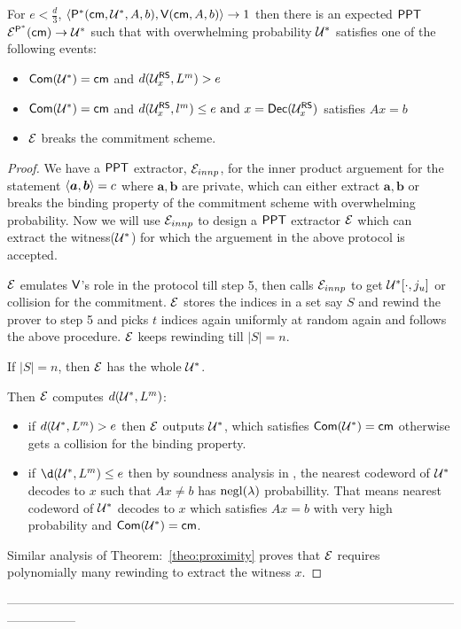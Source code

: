 \begin{theorem}
	For $e < \frac{d}{3} $, $\langle \mathsf{P}^*(\mathsf{cm}, \mathcal{U}^*, A, b),\mathsf{V}(\mathsf{cm}, A, b)\rangle \rightarrow 1 $ then there is an expected $\mathsf{PPT}$ $\mathcal{E}^{\mathsf{P}^*}(\mathsf{cm}) \rightarrow \mathcal{U}^*$ such that with overwhelming probability $\mathcal{U}^*$ satisfies one of the following events:
	\begin{itemize}
		\item $\mathsf{Com}(\mathcal{U}^*)=\mathsf{cm}$ and $d(\mathcal{U}^{\mathsf{RS}}_x,L^m) > e $
		\item $\mathsf{Com}(\mathcal{U}^*)=\mathsf{cm}$ and $d(\mathcal{U}^{\mathsf{RS}}_x, l^m)\leq e \text{ and } x = \mathsf{Dec}(\mathcal{U}^{\mathsf{RS}}_x)$ satisfies $ Ax = b$
		\item $\mathcal{E}$ breaks the commitment scheme.
	\end{itemize}
\end{theorem}

\begin{proof}
	We have a $\mathsf{PPT}$ extractor, $\mathcal{E}_{innp}$, for the inner product arguement for the statement $\langle \bm{a},\bm{b}\rangle=c$ where $\bm{a},\bm{b}$ are private, which can either extract $\bm{a}, \bm{b}$ or breaks the binding property of the commitment scheme with overwhelming probability. Now we will use $\mathcal{E}_{innp}$ to design a $\mathsf{PPT}$ extractor $\mathcal{E}$ which can extract the witness($\mathcal{U}^*$) for which the arguement in the above protocol is accepted.
	
	$\mathcal{E}$ emulates $\mathsf{V}$'s role in the protocol till step 5, then calls $\mathcal{E}_{innp}$ to get $\mathcal{U}^*[\cdot,j_u]$ or collision for the commitment. $\mathcal{E}$ stores the indices in a set say $S$ and rewind the prover to step 5 and picks $t$ indices again uniformly at random again and follows the above procedure. $\mathcal{E}$ keeps rewinding till $|S|=n$.
	
	If $|S|=n$, then $\mathcal{E}$ has the whole $\mathcal{U}^*$.
	
	Then $\mathcal{E}$ computes $d(\mathcal{U}^*, L^m)$:
	\begin{itemize}
		\item if $d(\mathcal{U}^*,L^m) > e$ then $\mathcal{E}$ outputs $\mathcal{U}^*$, which satisfies $\mathsf{Com}(\mathcal{U}^*)=\mathsf{cm}$ otherwise gets a collision for the binding property.
		
		\item if $\d(\calU^*,L^m) \leq e$ then by soundness analysis in \cite{Ligero2017}, the nearest codeword of $\mathcal{U}^*$ decodes to $x$ such that $Ax\neq b$ has $\mathrm{negl}(\lambda)$ probabillity. That means nearest codeword of $\mathcal{U}^*$ decodes to $x$ which satisfies $Ax=b$ with very high probability and $\mathsf{Com}(\mathcal{U}^*)=\mathsf{cm}$.
	\end{itemize}
	
	Similar analysis of Theorem:~\ref{theo:proximity} proves that $\mathcal{E}$ requires polynomially many rewinding to extract the witness $x$.
\end{proof}
-----------------------------------------------------------------------------------------------------------------------------
